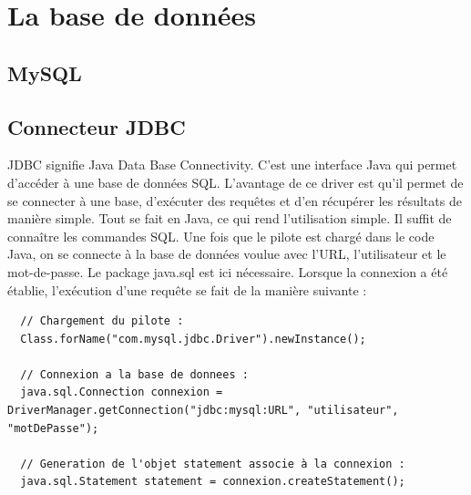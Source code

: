 \section{La base de données}

\subsection{MySQL}

\subsection{Connecteur JDBC}
JDBC signifie Java Data Base Connectivity. C'est une interface Java qui permet d'accéder à une base de données SQL.
L'avantage de ce driver est qu'il permet de se connecter à une base, d'exécuter des requêtes et d'en récupérer les résultats de manière simple.
Tout se fait en Java, ce qui rend l'utilisation simple. Il suffit de connaître les commandes SQL.
Une fois que le pilote est chargé dans le code Java, on se connecte à la base de données voulue avec l'URL, l'utilisateur et le mot-de-passe. Le package java.sql est ici nécessaire.
Lorsque la connexion a été établie, l'exécution d'une requête se fait de la manière suivante :

\begin{lstlisting}
  // Chargement du pilote :
  Class.forName("com.mysql.jdbc.Driver").newInstance();
  
  // Connexion a la base de donnees :
  java.sql.Connection connexion =  DriverManager.getConnection("jdbc:mysql:URL", "utilisateur", "motDePasse");
  
  // Generation de l'objet statement associe à la connexion :
  java.sql.Statement statement = connexion.createStatement();
\end{lstlisting}  
  
